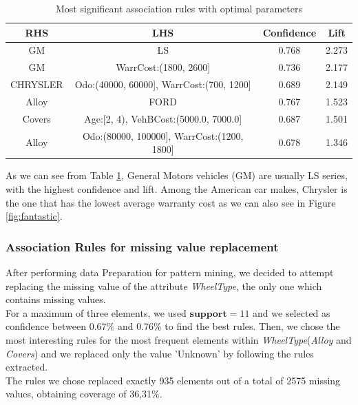 \documentclass{article}
\begin{document}
	\begin{table}[H]
		\centering
		\begin{tabular}{|cc|cc|}
			\hline
			\textbf{RHS} & \textbf{LHS} & \textbf{Confidence} & \textbf{Lift} \\
			\hline
			\rowcolor{Gray}
			GM & LS & 0.768 & 2.273\\
			GM & WarrCost:(1800, 2600] & 0.736 & 2.177\\
			\rowcolor{Gray}
			CHRYSLER & Odo:(40000, 60000], WarrCost:(700, 1200] & 0.689 & 2.149\\
			Alloy & FORD  & 0.767 & 1.523\\
			\rowcolor{Gray}
			Covers & Age:[2, 4), VehBCost:(5000.0, 7000.0]  & 0.687 & 1.501 \\
			Alloy &  Odo:(80000, 100000], WarrCost:(1200, 1800] &  0.678 & 1.346 \\
			\hline
		\end{tabular}
		\caption{Most significant association rules with optimal parameters}
		\label{tab:rules}
	\end{table}
	
	As we can see from Table \ref{tab:rules}, General Motors vehicles (GM) are usually LS series, with the highest confidence and lift. Among the American car makes, Chrysler is the one that has the lowest average warranty cost as we can also see in Figure \ref{fig:fantastic}. 
	
	
	\subsubsection{Association Rules for missing value replacement}
	
	After performing data Preparation for pattern mining, we decided to attempt replacing the missing value of the attribute \emph{WheelType}, the only one which contains missing values.\\
	For a maximum of three elements, we used $\mathbf{support}= 11$ and we selected as confidence between 0.67\% and 0.76\% to find the best rules.
	Then, we chose the most interesting rules for the most frequent elements within \emph{WheelType}(\emph{Alloy} and \emph{Covers}) and we replaced only the value 'Unknown' by following the rules extracted.  \\
	The rules we chose replaced exactly 935 elements out of a total of 2575 missing values, obtaining coverage of 36,31\%.\\
	
\end{document}

